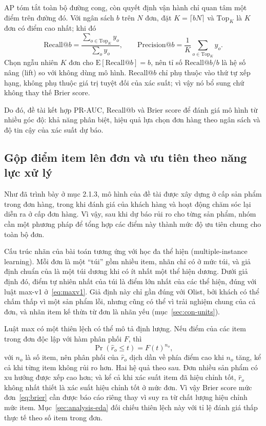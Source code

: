 \documentclass[12pt,a4paper]{report}
\begin{document}
AP tóm tắt toàn bộ đường cong, còn quyết định vận hành chỉ quan tâm một điểm trên đường đó. Với ngân sách $b$ trên $N$ đơn, đặt $K = \lceil bN \rceil$ và $\mathrm{Top}_K$ là $K$ đơn có điểm cao nhất; khi đó
\begin{equation}\label{eq:th-recallk}
  \mathrm{Recall@}b = \frac{\sum_{o \in \mathrm{Top}_K} y_o}{\sum_{o} y_o}, \qquad
  \mathrm{Precision@}b = \frac{1}{K} \sum_{o \in \mathrm{Top}_K} y_o .
\end{equation}
Chọn ngẫu nhiên $K$ đơn cho $\mathrm{E}[\mathrm{Recall@}b] = b$, nên tỉ số $\mathrm{Recall@}b / b$ là hệ số nâng (lift) so với không dùng mô hình. Recall@$b$ chỉ phụ thuộc vào thứ tự xếp hạng, không phụ thuộc giá trị tuyệt đối của xác suất; vì vậy nó bổ sung chứ không thay thế Brier score.

Do đó, đề tài kết hợp PR-AUC, Recall@b và Brier score để đánh giá mô hình từ nhiều góc độ: khả năng phân biệt, hiệu quả lựa chọn đơn hàng theo ngân sách và độ tin cậy của xác suất dự báo.

\subsection{Gộp điểm item lên đơn và ưu tiên theo năng lực xử lý}\label{sec:th-aggregation}

Như đã trình bày ở mục 2.1.3, mô hình của đề tài được xây dựng ở cấp sản phẩm trong đơn hàng, trong khi đánh giá của khách hàng và hoạt động chăm sóc lại diễn ra ở cấp đơn hàng. Vì vậy, sau khi dự báo rủi ro cho từng sản phẩm, nhóm cần một phương pháp để tổng hợp các điểm này thành mức độ ưu tiên chung cho toàn bộ đơn.

Cấu trúc nhãn của bài toán tương ứng với học đa thể hiện (multiple-instance learning). Mỗi đơn là một ``túi'' gồm nhiều item, nhãn chỉ có ở mức túi, và giả định chuẩn của \textcite{dietterich1997} là một túi dương khi có ít nhất một thể hiện dương. Dưới giả định đó, điểm tự nhiên nhất của túi là điểm lớn nhất của các thể hiện, đúng với luật max-v1 ở~\eqref{eq:maxv1}. Giả định này chỉ gần đúng với Olist, bởi khách có thể chấm thấp vì một sản phẩm lỗi, nhưng cũng có thể vì trải nghiệm chung của cả đơn, và nhãn item kế thừa từ đơn là nhãn yếu (mục~\ref{sec:con-units}).

Luật max có một thiên lệch có thể mô tả định lượng. Nếu điểm của các item trong đơn độc lập với hàm phân phối $F$, thì
\begin{equation}\label{eq:th-maxbias}
  \Pr\left( \hat{r}_o \le t \right) = F(t)^{n_o},
\end{equation}
với $n_o$ là số item, nên phân phối của $\hat r_o$ dịch dần về phía điểm cao khi $n_o$ tăng, kể cả khi từng item không rủi ro hơn. Hai hệ quả theo sau. Đơn nhiều sản phẩm có xu hướng được xếp cao hơn; và kể cả khi xác suất item đã hiệu chỉnh tốt, $\hat r_o$ không nhất thiết là xác suất hiệu chỉnh tốt ở mức đơn. Vì vậy Brier score mức đơn~\eqref{eq:brier} cần được báo cáo riêng thay vì suy ra từ chất lượng hiệu chỉnh mức item. Mục~\ref{sec:analysis-eda} đối chiếu thiên lệch này với tỉ lệ đánh giá thấp thực tế theo số item trong đơn.
\end{document}

